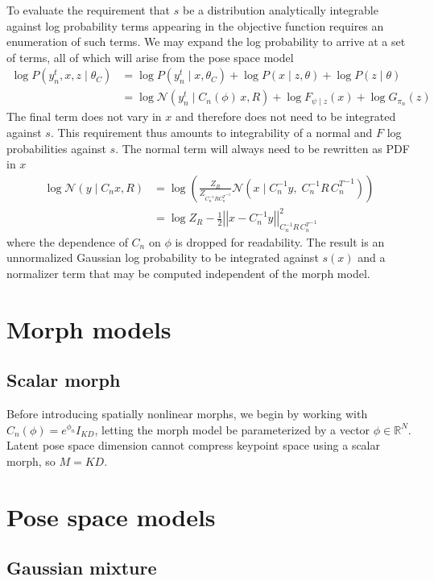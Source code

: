 \documentclass{article}         %
\newcommand{\inv}{^{-1}}
\newcommand{\RR}{\mathbb{R}}
\newcommand{\NN}{\mathcal{N}}
\newcommand{\norm}[1]{\left|\left| #1 \right|\right|}
\newcommand{\pn}[1]{\left( #1 \right)}
\begin{document}
To evaluate the requirement that $s$ be a distribution analytically integrable against log probability terms appearing in the objective function requires an enumeration of such terms. We may expand the log probability to arrive at a set of terms, all of which will arise from the pose space model
\begin{align}
    \log P(y^t_n, x, z \mid \theta_C) &= \log P(y^t_n \mid x, \theta_C) + \log P(x\mid z, \theta) + \log P(z\mid \theta) \\
    &= \log \NN(y^t_n \mid C_n(\phi)\, x, R) + \log F_{\psi\mid z}(x) + \log G_{\pi_n}(z)
    \label{eq:logprob-terms}
\end{align}
The final term does not vary in $x$ and therefore does not need to be integrated against $s$. This requirement thus amounts to integrability of a normal and $F$ log probabilities against $s$. The normal term will always need to be rewritten as PDF in $x$
\begin{align}
    \log \NN(y\mid C_n x, R) &= \log\pn{\frac{Z_{R}}{Z_{C_n\inv R {C_n^T}\inv}} \NN\pn{x\mid C_n\inv y,\; C_n\inv R\, {C_n^T}\inv}} \\ &= \log Z_{R} - \frac{1}{2}\norm{x - C_n\inv y}^2_{C_n\inv R\, {C_n^T}\inv}
    \label{eq:cn-swap}
\end{align}
where the dependence of $C_n$ on $\phi$ is dropped for readability. The result is an unnormalized Gaussian log probability to be integrated against $s(x)$ and a normalizer term that may be computed independent of the morph model. 

\section{Morph models}

\subsection{Scalar morph}

Before introducing spatially nonlinear morphs, we begin by working with $C_n(\phi) = e^{\phi_n} I_{KD}$, letting the morph model be parameterized by a vector $\phi \in \RR^N$. Latent pose space dimension cannot compress keypoint space using a scalar morph, so $M = KD$.

\section{Pose space models}

\subsection{Gaussian mixture}
\end{document}
